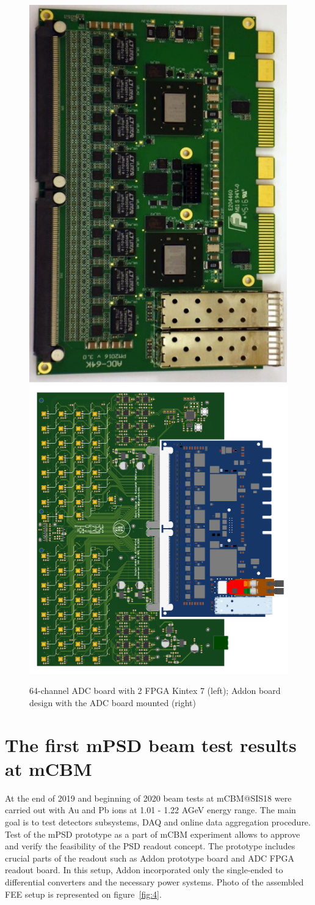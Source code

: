 \documentclass[a4paper,11pt]{article}
\begin{document}
\begin{figure}[htbp]
	\centering
	\includegraphics[width=.3\textwidth]{ADC_board.png}
	\quad
	\includegraphics[width=.4\textwidth]{ADC_addon.png}
	\caption{\label{fig:3} 64-channel ADC board with 2 FPGA Kintex 7 (left); Addon board design with the ADC board mounted (right)}
\end{figure}

\section{ The first mPSD beam test results at mCBM}
At the end of 2019 and beginning of 2020 beam tests at mCBM@SIS18 were carried out with Au and Pb ions at 1.01 - 1.22 AGeV energy range. The main goal is to test detectors subsystems, DAQ and online data aggregation procedure. Test of the mPSD prototype as a part of mCBM experiment allows to approve and verify the feasibility of the PSD readout concept. The prototype includes crucial parts of the readout such as Addon prototype board and ADC FPGA readout board. In this setup, Addon incorporated only the single-ended to differential converters and the necessary power systems. Photo of the assembled FEE setup is represented on figure~\ref{fig:4}.
\end{document}
